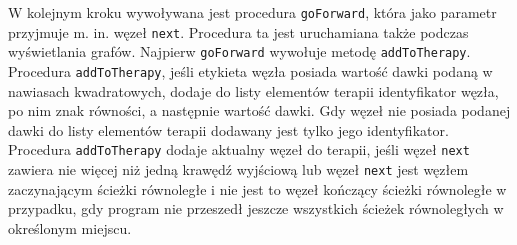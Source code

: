W kolejnym kroku wywoływana jest procedura \texttt{goForward}, która jako parametr przyjmuje m. in. węzeł \texttt{next}. 
Procedura ta jest uruchamiana także podczas wyświetlania grafów. Najpierw 
\texttt{goForward} wywołuje metodę \texttt{addToTherapy}. Procedura \texttt{addToTherapy}, jeśli etykieta węzła posiada wartość dawki podaną w nawiasach kwadratowych, dodaje do listy elementów terapii identyfikator węzła, po nim znak równości, a następnie wartość dawki. Gdy węzeł nie posiada podanej dawki do listy elementów terapii dodawany jest tylko jego identyfikator. 
Procedura \texttt{addToTherapy} dodaje aktualny węzeł do terapii, jeśli węzeł \texttt{next} zawiera nie więcej niż jedną krawędź wyjściową lub węzeł \texttt{next} jest węzłem zaczynającym ścieżki równoległe 
i nie jest to węzeł kończący ścieżki równoległe w przypadku, gdy program nie przeszedł jeszcze wszystkich ścieżek równoległych w określonym miejscu. 


